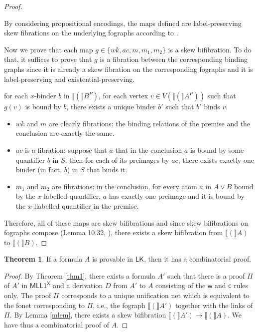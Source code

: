 \documentclass[conference,twosided,10pt]{IEEEtran}
\theoremstyle{definition}
\newtheorem{theorem_}[thm]{Theorem}
\newcommand*{\LK}{\mathsf{LK}}
\newcommand*{\FOMLL}{\mathsf{MLL1^X}}
\renewcommand\wD {\mathsf{w}}
\renewcommand\cD {\mathsf{c}}
\newcommand{\cor}{\vee}
\newcommand{\PE}[1]{#1^P}
\newcommand{\graphof}[1]{\llbracket#1\rrbracket}
\begin{document}
\begin{proof}
\begin{itemize}
\end{itemize}

By considering propositional encodings, the maps defined are label-preserving
skew fibrations on the underlying fographs according to
\cite{str:07:RTA}.

Now we prove that each map $g \in \{wk, ac, m, m_1, m_2 \}$ is a skew bifibration. To do that, it suffices to prove that $g$ is a fibration between the corresponding binding graphs since it is already a skew fibration on the corresponding fographs and it is label-preserving and existential-preserving.
\begin{center}
for each $x$-binder $b$ in $\graphof(\PE{B})$, for each vertex $v \in V(\graphof(\PE{A}))$
such that $g(v)$ is bound by $b$, there exists a unique binder $b'$ such
that $b'$ binds $v$.
\end{center}

\begin{itemize}
  \item $wk$ and $m$ are clearly fibrations: the binding relations of the premise and the conclusion are exactly the same.
  \item $ac$ is a fibration: suppose that $a$ that in the conclusion $a$ is bound by some quantifier $b$ in $S$, then for each of its preimages by $ac$, there exists exactly one binder (in fact, $b$) in $S$ that binds it.
  \item $m_1$ and $m_2$ are fibrations: in the conclusion, for every atom $a$ in $A \cor B$ bound by the $x$-labelled quantifier, $a$ has exactly one preimage and it is bound by the $x$-llabelled quantifier in the premise.
\end{itemize}

  Therefore, all of these maps are skew bifibrations and since skew bifibrations
on fographs compose (Lemma 10.32, \cite{hughes:fopws}), there exists a skew
bifibration from $\graphof(A)$ to $\graphof(B)$.

\end{proof}

\begin{theorem_}
If a formula $A$ is provable in $\LK$, then it has a combinatorial proof.
\end{theorem_}

\begin{proof}
By Theorem \ref{thm1}, there exists a formula $A'$ such that there is a proof
$\Pi$ of $A'$ in $\FOMLL$ and a derivation $D$ from $A'$ to $A$ consisting of
the $\wD$ and $\cD$ rules only. The proof $\Pi$ corresponds to a unique
unification net which is equivalent to the fonet corresponding to $\Pi$, i.e.,
the fograph $\graphof(A')$ together with the links of $\Pi$. By Lemma \ref{mlem}, 
there exists a skew bifibration $\graphof(A') \rightarrow \graphof(A)$. We have thus a
combinatorial proof of $A$.

\end{proof}
\end{document}
